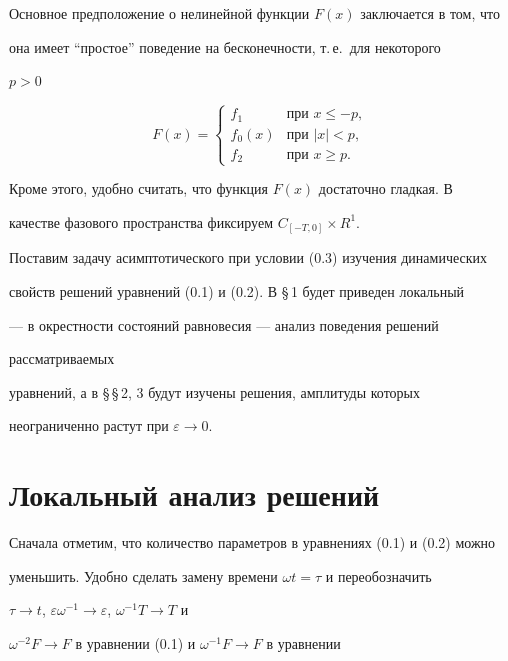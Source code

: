 Основное предположение о нелинейной функции $F(x)$ заключается в том, что


она имеет ``простое'' поведение на бесконечности, т.\,е.~для некоторого


$p>0$


$$


F(x)=


\begin{cases}


f_1 & \text{при } x \le -p, \\


f_0(x) & \text{при } |x|<p,\\


f_2 & \text{при } x \ge p.


\end{cases}


$$


Кроме этого, удобно считать, что функция $F(x)$ достаточно гладкая. В


качестве фазового пространства фиксируем $C_{[-T,0]}\times R^1$.





Поставим задачу асимптотического при условии (0.3) изучения динамических


свойств решений уравнений (0.1) и (0.2). В \S\,1 будет приведен локальный


--- в окрестности состояний равновесия --- анализ поведения решений


рассматриваемых


уравнений, а в \S\,\S\,2, 3 будут изучены решения, амплитуды которых


неограниченно растут при $\varepsilon\to 0$.





\section{Локальный анализ решений}





Сначала отметим, что количество параметров в уравнениях (0.1) и (0.2) можно


уменьшить. Удобно сделать замену времени $\omega t = \tau$ и переобозначить


$\tau\to t$, $\varepsilon\omega^{-1}\to\varepsilon$, $\omega^{-1}T\to T$ и


$\omega^{-2}F\to F$ в уравнении (0.1) и $\omega^{-1}F\to F$ в уравнении


